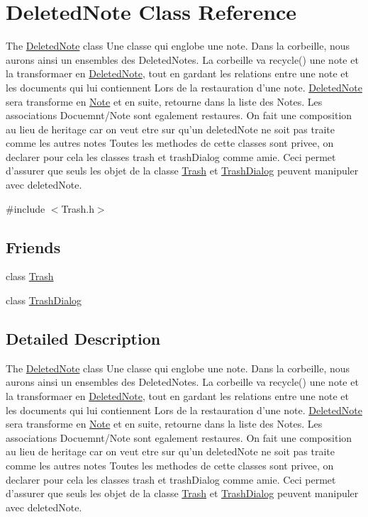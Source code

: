 \hypertarget{class_deleted_note}{\section{Deleted\-Note Class Reference}
\label{class_deleted_note}
}


The \hyperlink{class_deleted_note}{Deleted\-Note} class Une classe qui englobe une note. Dans la corbeille, nous aurons ainsi un ensembles des Deleted\-Notes. La corbeille va recycle() une note et la transformaer en \hyperlink{class_deleted_note}{Deleted\-Note}, tout en gardant les relations entre une note et les documents qui lui contiennent Lors de la restauration d'une note. \hyperlink{class_deleted_note}{Deleted\-Note} sera transforme en \hyperlink{class_note}{Note} et en suite, retourne dans la liste des Notes. Les associations Docuemnt/\-Note sont egalement restaures. On fait une composition au lieu de heritage car on veut etre sur qu'un deleted\-Note ne soit pas traite comme les autres notes Toutes les methodes de cette classes sont privee, on declarer pour cela les classes trash et trash\-Dialog comme amie. Ceci permet d'assurer que seuls les objet de la classe \hyperlink{class_trash}{Trash} et \hyperlink{class_trash_dialog}{Trash\-Dialog} peuvent manipuler avec deleted\-Note.  




{\ttfamily \#include $<$Trash.\-h$>$}

\subsection*{Friends}
\begin{DoxyCompactItemize}
\item 
class \hyperlink{class_deleted_note_aa5b165af6155aa1d6b8c634a27eae73f}{Trash}
\item 
class \hyperlink{class_deleted_note_abd99e75afa232a2ca91c06161fc1e847}{Trash\-Dialog}
\end{DoxyCompactItemize}


\subsection{Detailed Description}
The \hyperlink{class_deleted_note}{Deleted\-Note} class Une classe qui englobe une note. Dans la corbeille, nous aurons ainsi un ensembles des Deleted\-Notes. La corbeille va recycle() une note et la transformaer en \hyperlink{class_deleted_note}{Deleted\-Note}, tout en gardant les relations entre une note et les documents qui lui contiennent Lors de la restauration d'une note. \hyperlink{class_deleted_note}{Deleted\-Note} sera transforme en \hyperlink{class_note}{Note} et en suite, retourne dans la liste des Notes. Les associations Docuemnt/\-Note sont egalement restaures. On fait une composition au lieu de heritage car on veut etre sur qu'un deleted\-Note ne soit pas traite comme les autres notes Toutes les methodes de cette classes sont privee, on declarer pour cela les classes trash et trash\-Dialog comme amie. Ceci permet d'assurer que seuls les objet de la classe \hyperlink{class_trash}{Trash} et \hyperlink{class_trash_dialog}{Trash\-Dialog} peuvent manipuler avec deleted\-Note. 


